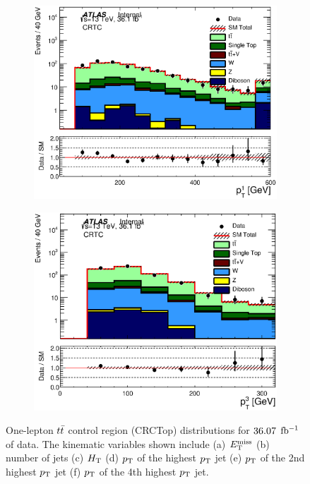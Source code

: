 \begin{figure}[h!]
\begin{center}
\begin{subfigure}[b]{0.40\textwidth}
    	 \includegraphics[width=\textwidth]{figures/plotRegion/JetPt_1__CRTopC_log.eps}
                \caption{ }
    \end{subfigure}
    \begin{subfigure}[b]{0.40\textwidth}    
    	 \includegraphics[width=\textwidth]{figures/plotRegion/JetPt_3__CRTopC_log.eps}
               \caption{ }
    \end{subfigure}
     \caption[One-lepton $\ttbar$ control region (CRCTop) distributions for $\intlumi$ $\ifb$ of data]{ One-lepton $\ttbar$ control region (CRCTop) distributions for $\intlumi$ $\ifb$ of data. The kinematic variables shown include (a) $E_{\mathrm{T}}^{\mathrm{miss}}$ (b) number of jets (c) $H_{\mathrm{T}}$ (d) $p_{\mathrm{T}}$ of the highest $p_{\mathrm{T}}$ jet (e) $p_{\mathrm{T}}$ of the 2nd highest $p_{\mathrm{T}}$ jet (f) $p_{\mathrm{T}}$ of the 4th highest $p_{\mathrm{T}}$ jet. }%

\end{center}
\end{figure}
